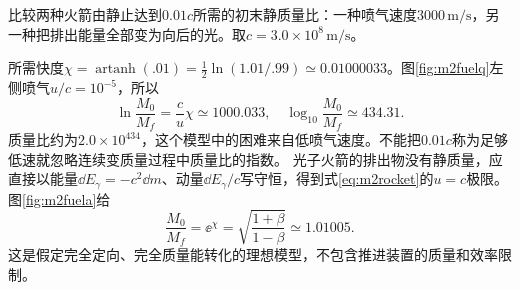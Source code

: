 \begin{example}\label{ex:m2fuel}
比较两种火箭由静止达到$0.01c$所需的初末静质量比：一种喷气速度$3000\,\mathrm{m/s}$，另一种把排出能量全部变为向后的光。取$c=3.0\times10^8\,\mathrm{m/s}$。
\end{example}
\begin{solution}
所需快度$\chi=\operatorname{artanh}(.01)=\tfrac12\ln(1.01/.99)\simeq0.01000033$。图\ref{fig:m2fuelq}左侧喷气$u/c=10^{-5}$，所以
\[
 \ln\frac{M_0}{M_f}=\frac c u\chi\simeq1000.033,
 \quad \log_{10}\frac{M_0}{M_f}\simeq434.31.
\]
质量比约为$2.0\times10^{434}$，这个模型中的困难来自低喷气速度。不能把$0.01c$称为足够低速就忽略连续变质量过程中质量比的指数。
光子火箭的排出物没有静质量，应直接以能量$\dd E_\gamma=-c^2\dd m$、动量$\dd E_\gamma/c$写守恒，得到式\eqref{eq:m2rocket}的$u=c$极限。图\ref{fig:m2fuela}给
\[
 \frac{M_0}{M_f}=\ee^\chi=\sqrt{\frac{1+\beta}{1-\beta}}\simeq1.01005.
\]
这是假定完全定向、完全质量能转化的理想模型，不包含推进装置的质量和效率限制。
\end{solution}

